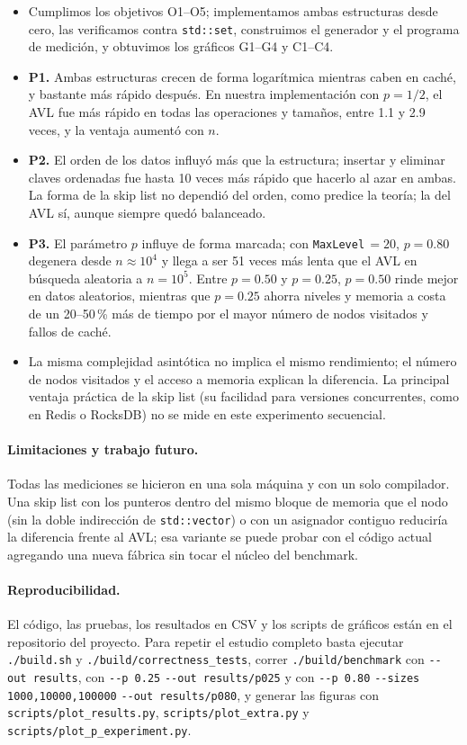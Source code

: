 \documentclass[11pt,a4paper]{article}
\begin{document}
\begin{itemize}
  \item Cumplimos los objetivos O1--O5; implementamos ambas estructuras desde
  cero, las verificamos contra \texttt{std::set}, construimos el generador y
  el programa de medición, y obtuvimos los gráficos G1--G4 y C1--C4.
  \item \textbf{P1.} Ambas estructuras crecen de forma logarítmica mientras
  caben en caché, y bastante más rápido después. En nuestra implementación con
  $p = 1/2$, el AVL fue más rápido en todas las operaciones y tamaños, entre
  1.1 y 2.9 veces, y la ventaja aumentó con $n$.
  \item \textbf{P2.} El orden de los datos influyó más que la estructura;
  insertar y eliminar claves ordenadas fue hasta 10 veces más rápido que
  hacerlo al azar en ambas. La forma de la skip list no dependió del orden,
  como predice la teoría; la del AVL sí, aunque siempre quedó balanceado.
  \item \textbf{P3.} El parámetro $p$ influye de forma marcada; con
  \texttt{MaxLevel}$\,=20$, $p=0.80$ degenera desde $n \approx 10^4$ y llega a
  ser 51 veces más lenta que el AVL en búsqueda aleatoria a $n=10^5$. Entre
  $p=0.50$ y $p=0.25$, $p=0.50$ rinde mejor en datos aleatorios, mientras que
  $p=0.25$ ahorra niveles y memoria a costa de un 20--50\,\% más de tiempo por
  el mayor número de nodos visitados y fallos de caché.
  \item La misma complejidad asintótica no implica el mismo rendimiento; el
  número de nodos visitados y el acceso a memoria explican la diferencia. La
  principal ventaja práctica de la skip list (su facilidad para versiones
  concurrentes, como en Redis o RocksDB) no se mide en este experimento
  secuencial.
\end{itemize}

\paragraph{Limitaciones y trabajo futuro.}
Todas las mediciones se hicieron en una sola máquina y con un solo
compilador. Una skip list con los punteros dentro del mismo bloque de memoria
que el nodo (sin la doble indirección de \texttt{std::vector}) o con un
asignador contiguo reduciría la diferencia frente al AVL; esa variante se puede
probar con el código actual agregando una nueva fábrica sin tocar el núcleo del
benchmark.

\paragraph{Reproducibilidad.}
El código, las pruebas, los resultados en CSV y los scripts de gráficos están
en el repositorio del proyecto. Para repetir el estudio completo basta ejecutar
\texttt{./build.sh} y \texttt{./build/correctness\_tests}, correr
\texttt{./build/benchmark} con \texttt{-{}-out results}, con
\texttt{-{}-p 0.25} \texttt{-{}-out results/p025} y con
\texttt{-{}-p 0.80} \texttt{-{}-sizes 1000,10000,100000}
\texttt{-{}-out results/p080}, y generar las figuras con
\texttt{scripts/plot\_results.py}, \texttt{scripts/plot\_extra.py} y
\texttt{scripts/plot\_p\_experiment.py}.
\end{document}
